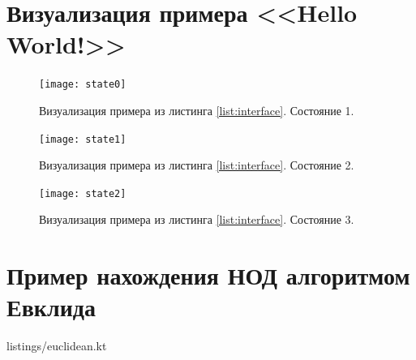 \chapter{Визуализация примера <<Hello World!>>} \label{AppendixA}

\begin{figure}[h]
	\centering
	\texttt{[image: state0]}
	\caption{Визуализация примера из листинга \ref{list:interface}. Состояние 1.}
	\label{fig:state1}
\end{figure}

\begin{figure}[h]
	\centering
	\texttt{[image: state1]}
	\caption{Визуализация примера из листинга \ref{list:interface}. Состояние 2.}
	\label{fig:state2}
\end{figure}


\begin{figure}[h]
	\centering
	\texttt{[image: state2]}
	\caption{Визуализация примера из листинга \ref{list:interface}. Состояние 3.}
	\label{fig:state3}
\end{figure}

\chapter{Пример нахождения НОД алгоритмом Евклида} \label{AppendixB}

 {listings/euclidean.kt}

